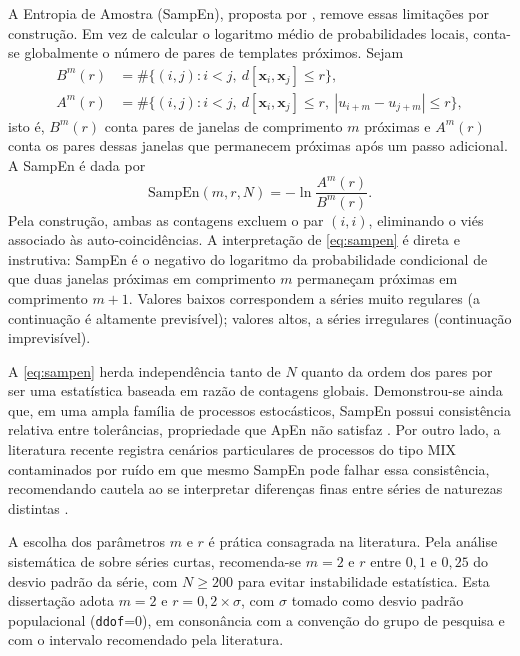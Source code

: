 A Entropia de Amostra (SampEn), proposta por ,
remove essas limitações por construção. Em vez de calcular o
logaritmo médio de probabilidades locais, conta-se globalmente o
número de pares de templates próximos. Sejam
\begin{align}
  B^m(r) &= \#\{(i, j) : i < j,\ d[\mathbf{x}_i, \mathbf{x}_j] \le r\},
  \label{eq:sampen-B} \\
  A^m(r) &= \#\{(i, j) : i < j,\ d[\mathbf{x}_i, \mathbf{x}_j] \le r,
                       \ |u_{i+m} - u_{j+m}| \le r\},
  \label{eq:sampen-A}
\end{align}
isto é, $B^m(r)$ conta pares de janelas de comprimento $m$ próximas e
$A^m(r)$ conta os pares dessas janelas que permanecem próximas após
um passo adicional. A SampEn é dada por
\begin{equation}
  \mathrm{SampEn}(m, r, N) = -\ln \frac{A^m(r)}{B^m(r)}.
  \label{eq:sampen}
\end{equation}
Pela construção, ambas as contagens excluem o par $(i, i)$, eliminando
o viés associado às auto-coincidências. A interpretação de
\autoref{eq:sampen} é direta e instrutiva: SampEn é o negativo do
logaritmo da probabilidade condicional de que duas janelas próximas
em comprimento $m$ permaneçam próximas em comprimento $m + 1$.
Valores baixos correspondem a séries muito regulares (a continuação
é altamente previsível); valores altos, a séries irregulares
(continuação imprevisível).

A \autoref{eq:sampen} herda independência tanto de $N$ quanto da
ordem dos pares por ser uma estatística baseada em razão de contagens
globais. Demonstrou-se ainda que, em uma ampla família de processos
estocásticos, SampEn possui consistência relativa entre tolerâncias,
propriedade que ApEn não satisfaz \cite{richman2000}. Por outro lado,
a literatura recente registra cenários particulares de processos do
tipo $\mathrm{MIX}$ contaminados por ruído em que mesmo SampEn pode
falhar essa consistência, recomendando cautela ao se interpretar
diferenças finas entre séries de naturezas distintas
\cite{delgadobonal2019}.

A escolha dos parâmetros $m$ e $r$ é prática consagrada na
literatura. Pela análise sistemática de  sobre
séries curtas, recomenda-se $m = 2$ e $r$ entre $0{,}1$ e $0{,}25$ do
desvio padrão da série, com $N \ge 200$ para evitar instabilidade
estatística. Esta dissertação adota $m = 2$ e $r = 0{,}2 \times
\sigma$, com $\sigma$ tomado como desvio padrão populacional
(\texttt{ddof}=0), em consonância com a convenção do grupo de pesquisa
e com o intervalo recomendado pela literatura.

